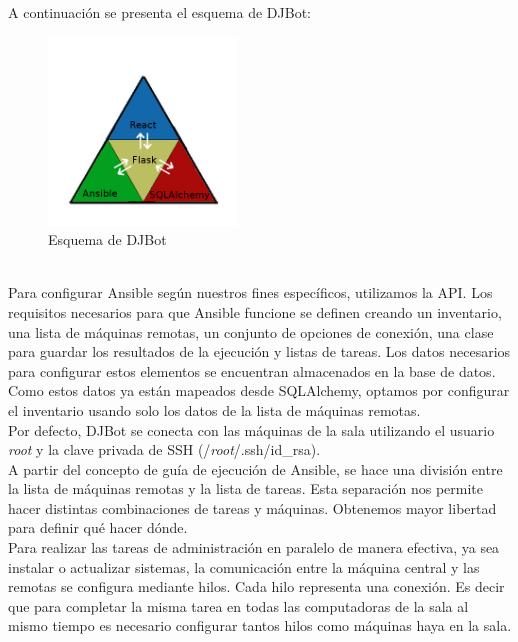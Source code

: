 \documentclass[a4paper,12pt]{article}
\begin{document}
A continuación se presenta el esquema de DJBot:\\

\begin{figure}[htb]
\centering
\includegraphics[width=5cm]{./img/tecnologias.jpg}
\caption{Esquema de DJBot}
\end{figure}\\

Para configurar Ansible según nuestros fines específicos, utilizamos la API. Los requisitos necesarios para que Ansible funcione se definen creando un  inventario, una lista de máquinas remotas, un conjunto de opciones de conexión, una clase para guardar los resultados de la ejecución y listas de tareas. Los datos necesarios para configurar estos elementos se encuentran almacenados en la base de datos. Como estos datos ya están mapeados desde SQLAlchemy, optamos por configurar el inventario usando solo los datos de la lista de máquinas remotas.\\

Por defecto, DJBot se conecta con las máquinas de la sala utilizando el usuario \emph{root} y la clave privada  de SSH (/\emph{root}/.ssh/id\_rsa).\\

A partir del concepto de guía de ejecución de Ansible, se hace una división entre la lista de máquinas remotas y la lista de tareas. Esta separación nos permite hacer distintas combinaciones de tareas y máquinas. Obtenemos mayor libertad para definir qué hacer dónde.\\

Para realizar las tareas de administración en paralelo de manera efectiva, ya sea instalar o actualizar sistemas, la comunicación entre la máquina central y las remotas se configura mediante hilos. Cada hilo representa una conexión. Es decir que para completar la misma tarea en todas las computadoras de la sala al mismo tiempo es necesario configurar tantos hilos como máquinas haya en la sala.\\
\end{document}
